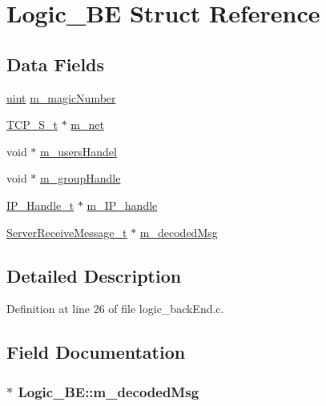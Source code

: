 \hypertarget{structLogic__BE}{}\section{Logic\+\_\+\+BE Struct Reference}
\label{structLogic__BE}
\subsection*{Data Fields}
\begin{DoxyCompactItemize}
\item 
\hyperlink{tcp_8h_a91ad9478d81a7aaf2593e8d9c3d06a14}{uint} \hyperlink{structLogic__BE_ae61735c21ef968851a2eacb8511188fa}{m\+\_\+magic\+Number}
\item 
\hyperlink{tcp_8h_a03d44ed4c82d8938cc484f7d14284b24}{T\+C\+P\+\_\+\+S\+\_\+t} $\ast$ \hyperlink{structLogic__BE_a3c05a016e4fea8ee6584b26afffe11c7}{m\+\_\+net}
\item 
void $\ast$ \hyperlink{structLogic__BE_af7dbb1a314b55075e00b79eb36b3d39e}{m\+\_\+users\+Handel}
\item 
void $\ast$ \hyperlink{structLogic__BE_a7f066039d469af42992f7b84cd157867}{m\+\_\+group\+Handle}
\item 
\hyperlink{ipHandle_8h_add91812b3634709f7dfe7d00713c83d1}{I\+P\+\_\+\+Handle\+\_\+t} $\ast$ \hyperlink{structLogic__BE_ad411dc90a15355dd051a0b18f3e65f10}{m\+\_\+\+I\+P\+\_\+handle}
\item 
\hyperlink{Protocol_8h_a2b69287f8af88d9e2f51d882b3ad4354}{Server\+Receive\+Message\+\_\+t} $\ast$ \hyperlink{structLogic__BE_a922bc1a94c1ed460a7548ad1ef4f90ea}{m\+\_\+decoded\+Msg}
\end{DoxyCompactItemize}


\subsection{Detailed Description}


Definition at line 26 of file logic\+\_\+back\+End.\+c.



\subsection{Field Documentation}
\subsubsection[{\texorpdfstring{m\+\_\+decoded\+Msg}{m_decodedMsg}}]{$\ast$ Logic\+\_\+\+B\+E\+::m\+\_\+decoded\+Msg}\hypertarget{structLogic__BE_a922bc1a94c1ed460a7548ad1ef4f90ea}{}\label{structLogic__BE_a922bc1a94c1ed460a7548ad1ef4f90ea}


